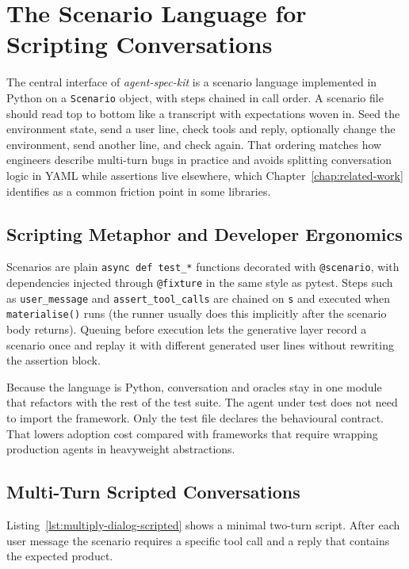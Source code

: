\section{The Scenario Language for Scripting Conversations}
\label{sec:scenario-language}

The central interface of \emph{agent-spec-kit} is a scenario language implemented in Python on a \texttt{Scenario} object, with steps chained in call order. A scenario file should read top to bottom like a transcript with expectations woven in. Seed the environment state, send a user line, check tools and reply, optionally change the environment, send another line, and check again. That ordering matches how engineers describe multi-turn bugs in practice and avoids splitting conversation logic in YAML while assertions live elsewhere, which Chapter~\ref{chap:related-work} identifies as a common friction point in some libraries.

\subsection{Scripting Metaphor and Developer Ergonomics}

Scenarios are plain \texttt{async def test\_*} functions decorated with \texttt{@scenario}, with dependencies injected through \texttt{@fixture} in the same style as pytest. Steps such as \texttt{user\_message} and \texttt{assert\_tool\_calls} are chained on \texttt{s} and executed when \texttt{materialise()} runs (the runner usually does this implicitly after the scenario body returns). Queuing before execution lets the generative layer record a scenario once and replay it with different generated user lines without rewriting the assertion block.

Because the language is Python, conversation and oracles stay in one module that refactors with the rest of the test suite. The agent under test does not need to import the framework. Only the test file declares the behavioural contract. That lowers adoption cost compared with frameworks that require wrapping production agents in heavyweight abstractions.

\subsection{Multi-Turn Scripted Conversations}

Listing~\ref{lst:multiply-dialog-scripted} shows a minimal two-turn script. After each user message the scenario requires a specific tool call and a reply that contains the expected product.

